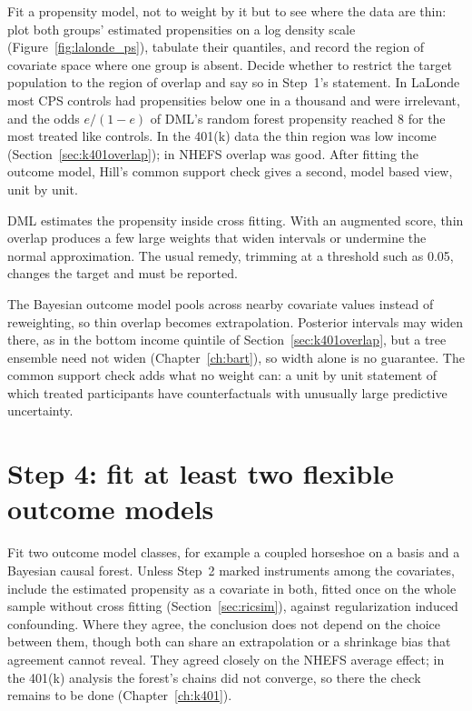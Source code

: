 Fit a propensity model, not to weight by it but to see where the data are thin: plot both groups' estimated propensities on a log density scale (Figure~\ref{fig:lalonde_ps}), tabulate their quantiles, and record the region of covariate space where one group is absent. Decide whether to restrict the target population to the region of overlap and say so in Step~1's statement. In LaLonde most CPS controls had propensities below one in a thousand and were irrelevant, and the odds $e/(1 - e)$ of DML's random forest propensity reached 8 for the most treated like controls. In the 401(k) data the thin region was low income (Section~\ref{sec:k401overlap}); in NHEFS overlap was good. After fitting the outcome model, Hill's common support check gives a second, model based view, unit by unit.

DML estimates the propensity inside cross fitting. With an augmented score, thin overlap produces a few large weights that widen intervals or undermine the normal approximation. The usual remedy, trimming at a threshold such as 0.05, changes the target and must be reported.

The Bayesian outcome model pools across nearby covariate values instead of reweighting, so thin overlap becomes extrapolation. Posterior intervals may widen there, as in the bottom income quintile of Section~\ref{sec:k401overlap}, but a tree ensemble need not widen (Chapter~\ref{ch:bart}), so width alone is no guarantee. The common support check adds what no weight can: a unit by unit statement of which treated participants have counterfactuals with unusually large predictive uncertainty.

\section{Step 4: fit at least two flexible outcome models}

Fit two outcome model classes, for example a coupled horseshoe on a basis and a Bayesian causal forest. Unless Step~2 marked instruments among the covariates, include the estimated propensity as a covariate in both, fitted once on the whole sample without cross fitting (Section~\ref{sec:ricsim}), against regularization induced confounding. Where they agree, the conclusion does not depend on the choice between them, though both can share an extrapolation or a shrinkage bias that agreement cannot reveal. They agreed closely on the NHEFS average effect; in the 401(k) analysis the forest's chains did not converge, so there the check remains to be done (Chapter~\ref{ch:k401}).

